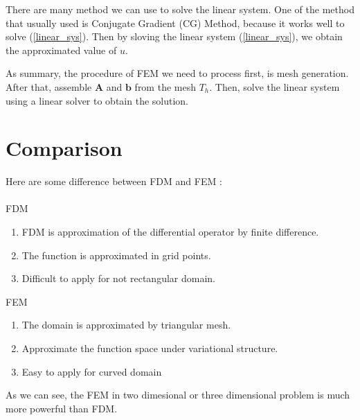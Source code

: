 \documentclass[]{article}
\begin{document}
There are many method we can use to solve the linear system. One of the method that usually used is Conjugate Gradient (CG) Method, because it works well to solve (\ref{linear_sys}). Then by sloving the linear system (\ref{linear_sys}), we obtain the approximated value of $ u $.

As summary, the procedure of FEM we need to process first, is mesh generation. After that, assemble $ \mathbf{A} $ and $ \mathbf{b} $ from the mesh $ T_{h} $. Then, solve the linear system using a linear solver to obtain the solution.


\section{Comparison}
Here are some difference between FDM and FEM :\\ \\
FDM
\begin{enumerate}
	\item FDM is approximation of the differential operator by finite difference.
	\item The function is approximated in grid points.
	\item Difficult to apply for not rectangular domain.
\end{enumerate}
FEM
\begin{enumerate}
	\item The domain is approximated by triangular mesh.
	\item Approximate the function space under variational structure.
	\item Easy to apply for curved domain
\end{enumerate}

As we can see, the FEM in two dimesional  or three dimensional problem is much more powerful than FDM.
\end{document}
